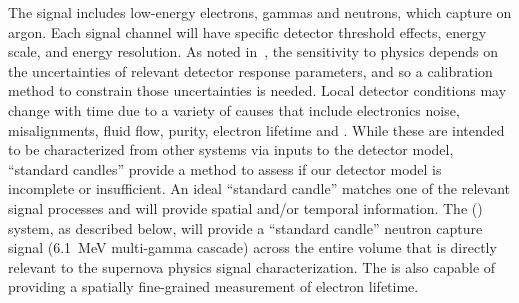 

The  signal includes low-energy  electrons, gammas and neutrons, %
which capture on argon. Each signal channel will have specific detector threshold effects, energy scale, and energy resolution. 
As noted in~\physchsnb, 
the sensitivity to  physics 
depends on the uncertainties of relevant detector response parameters, and so a calibration method to constrain those uncertainties is needed.
Local detector conditions may change with time due to a variety of 
causes that include electronics noise, misalignments, fluid flow,  purity, electron lifetime and \efield. While these are intended to be characterized from other systems via inputs to the detector model, ``standard candles'' provide a method to assess if our detector model is incomplete or insufficient. An ideal ``standard candle'' matches one of the relevant signal processes and will provide spatial and/or temporal information. The  () system, as described below, will provide a ``standard candle'' neutron capture signal (\SI{6.1}{\MeV} multi-gamma cascade) across the entire  volume that is directly relevant to the supernova physics signal characterization. The  is also capable of providing a spatially fine-grained measurement of electron lifetime. 



